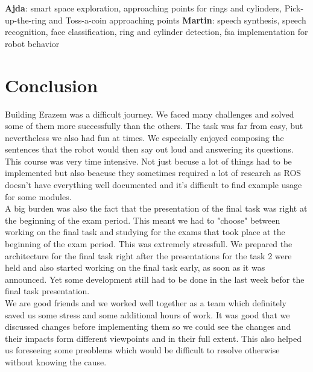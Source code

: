 \documentclass[12pt,a4paper]{article}
\begin{document}
	\textbf{Ajda}: smart space exploration, approaching points for rings and cylinders, Pick-up-the-ring and Toss-a-coin approaching points
	\textbf{Martin}: speech synthesis, speech recognition, face classification, ring and cylinder detection, fsa implementation for robot behavior
	
	\section{Conclusion}
	Building Erazem was a difficult journey. We faced many challenges and solved some of them more successfully than the others. The task was far from easy, but nevertheless we also had fun at times. We especially enjoyed composing the sentences that the robot would then say out loud and answering its questions. \\

	This course was very time intensive. Not just becuse a lot of things had to be implemented but also beacuse they sometimes required a lot of research as ROS doesn't have everything well documented and it's difficult to find example usage for some modules. \\

	A big burden was also the fact that the presentation of the final task was right at the beginning of the exam period. This meant we had to "choose" between working on the final task and studying for the exams that took place at the beginning of the exam period. This was extremely stressfull. We prepared the architecture for the final task right after the presentations for the task 2 were held and also started working on the final task early, as soon as it was announced. Yet some development still had to be done in the last week befor the final task presentation. \\
	
	We are good friends and we worked well together as a team which definitely saved us some stress and some additional hours of work. It was good that we discussed changes before implementing them so we could see the changes and their impacts form different viewpoints and in their full extent. This also helped us foreseeing some preoblems which would be difficult to resolve otherwise without knowing the cause. \\
\end{document}
